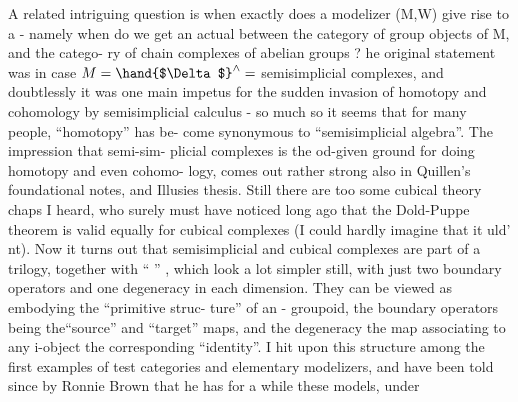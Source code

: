 A related intriguing question is when exactly does a modelizer (M,W)
give rise to a \hand{\uline{\textcolor{black}{Dold-Puppe theorem}}}  -  namely when do we get an actual \hand{\uline{\textcolor{black}{equi-}}}%
\hand{\uline{\textcolor{black}{valence}}} between the category of \hand{\uline{\textcolor{black}{abelian}}} group objects of M,  and the catego-%
ry of chain complexes of abelian groups ?  he original statement was in
case  $M = \hand{$\Delta$}^{\wedge} =$  semisimplicial complexes,  and doubtlessly it was one main
impetus for the sudden invasion of homotopy and cohomology by semisimplicial
calculus  -  so much so it seems that for many people,  ``homotopy'' has be-%
come synonymous to ``semisimplicial algebra''.  The impression that semi-sim-%
plicial complexes is the od-given ground for doing homotopy and even cohomo-%
logy,  comes out rather strong also in Quillen's foundational notes, and
 Illusies thesis.  Still there are too some cubical theory chaps I heard,
who surely must have noticed long ago that the Dold-Puppe theorem is valid
equally  for cubical complexes (I could hardly imagine that it uld'
 nt).  Now it turns out that semisimplicial and cubical complexes are
part of a trilogy,  together with ``\hand{\uline{\textcolor{black}{hemispherical}}} \hand{\uline{\textcolor{black}{complexes}}}'' ,  which look
a lot simpler still,  with just two boundary operators and one degeneracy
in each dimension.  They can be viewed as  embodying the ``primitive struc-%
ture'' of an \hand{$\infty$}- groupoid,  the boundary operators being the``source'' and
``target'' maps,  and the degeneracy the map associating to any i-object the
corresponding ``identity''.  \hand{(} I hit upon this structure among the first
examples of test categories and elementary modelizers,  and have been told
since by Ronnie Brown that he has  for a while these models,  under

